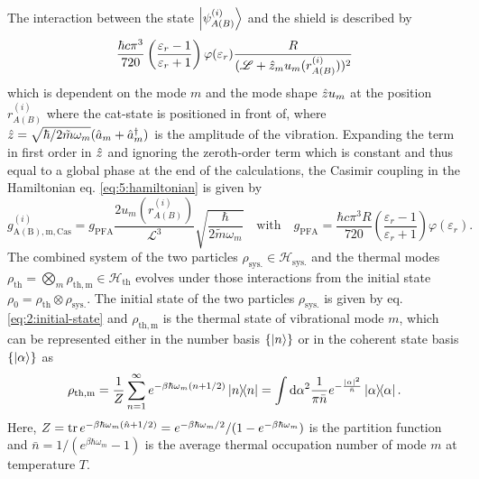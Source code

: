 The interaction between the state $\ket{\psi^{(i)}_{A(B)}}$ and the shield is described by 
\begin{equation}
  \frac{\hbar c \pi^3}{720}\left(\frac{\varepsilon_r - 1}{\varepsilon_r + 1}\right) \varphi(\varepsilon_r) \frac{R}{(\mathscr{L} + \hat{z}_m u_m(r^{(i)}_{A(B)}))^2}
\end{equation}
which is dependent on the mode $m$ and the mode shape $\hat{z}u_m$ at the position $r^{(i)}_{A(B)}$ where the cat-state is positioned in front of, where $\hat{z} = \sqrt{\hbar/2\tilde{m}\omega_m}(\hat{a}_m + \hat{a}^\dagger_m)$ is the amplitude of the vibration.
Expanding the term in first order in $\hat{z}$ and ignoring the zeroth-order term which is constant and thus equal to a global phase at the end of the calculations, the Casimir coupling in the Hamiltonian eq. \eqref{eq:5:hamiltonian} is given by
\begin{equation}
  g^{(i)}_\mathrm{A(B),m,Cas} = g_\mathrm{PFA} \frac{2 u_m(r^{(i)}_{A(B)})}{\mathscr{L}^3} \sqrt{\frac{\hbar}{2\tilde{m}\omega_m}}
  \quad \text{with} \quad 
  g_\mathrm{PFA} = \frac{\hbar c \pi^3 R}{720} \left(\frac{\varepsilon_r - 1}{\varepsilon_r + 1}\right) \varphi(\varepsilon_r) .
\end{equation} 
The combined system of the two particles $\rho_\mathrm{sys.} \in \mathcal{H}_\mathrm{sys.}$ and the thermal modes $\rho_\mathrm{th} = \bigotimes_m \rho_\mathrm{th, m} \in \mathcal{H}_\mathrm{th}$ evolves under those interactions from the initial state $\rho_0 = \rho_\mathrm{th} \otimes \rho_\mathrm{sys.}$. 
The initial state of the two particles $\rho_\mathrm{sys.}$ is given by eq. \eqref{eq:2:initial-state} and $\rho_\mathrm{th,m}$ is the thermal state of vibrational mode $m$, which can be represented either in the number basis $\{\ket{n}\}$ or in the coherent state basis $\{\ket{\alpha}\}$ as \cite{Steiner_2024}
\begin{equation}
  \rho_\mathrm{th,m} = \frac{1}{Z} \sum_{n=1}^\infty e^{-\beta \hbar \omega_m (n + 1/2)} \ketbra{n} = \int \dd \alpha^2 \frac{1}{\pi \bar{n}} e^{-\frac{\left\lvert\alpha\right\rvert^2}{\bar{n}}} \ketbra{\alpha} .
\end{equation} 
Here, $Z = \tr e^{-\beta \hbar \omega_m (\hat{n}+1/2)} = e^{-\beta \hbar \omega_m/2}/(1-e^{-\beta \hbar \omega_m})$ is the partition function and $\bar{n} = 1/(e^{\beta \hbar \omega_m} - 1)$ is the average thermal occupation number of mode $m$ at temperature $T$. 

